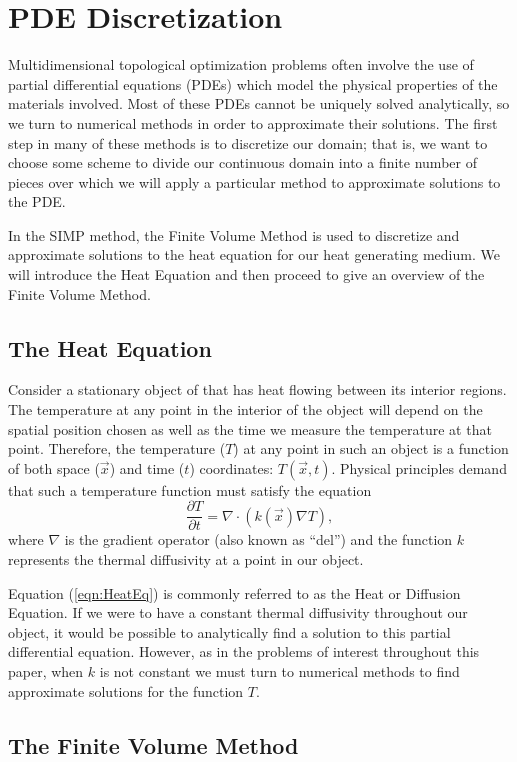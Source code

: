 \section{PDE Discretization}
Multidimensional topological optimization problems often involve the use of partial differential equations (PDEs) which model the physical properties of the materials involved. Most of these PDEs cannot be uniquely solved analytically, so we turn to numerical methods in order to approximate their solutions. The first step in many of these methods is to discretize our domain; that is, we want to choose some scheme to divide our continuous domain into a finite number of pieces over which we will apply a particular method to approximate solutions to the PDE.

In the SIMP method, the Finite Volume Method is used to discretize and approximate solutions to the heat equation for our heat generating medium. We will introduce the Heat Equation and then proceed to give an overview of the Finite Volume Method.
\subsection{The Heat Equation}
Consider a stationary object of that has heat flowing between its interior regions. The temperature at any point in the interior of the object will depend on the spatial position chosen as well as the time we measure the temperature at that point. Therefore, the temperature ($T$) at any point in such an object is a function of both space ($\vec{x}$) and time ($t$) coordinates: $T(\vec{x},t)$.
Physical principles demand that such a temperature function must satisfy the equation
\begin{equation}
	\frac{\partial T}{\partial t}=\nabla\cdot\left(k(\vec{x})\nabla T\right)\label{eqn:HeatEq},
\end{equation}
where $\nabla$ is the gradient operator (also known as ``del'') and the function $k$ represents the thermal diffusivity at a point in our object.

Equation (\ref{eqn:HeatEq}) is commonly referred to as the Heat or Diffusion Equation. If we were to have a constant thermal diffusivity throughout our object, it would be possible to analytically find a solution to this partial differential equation. However, as in the problems of interest throughout this paper, when $k$ is not constant we must turn to numerical methods to find approximate solutions for the function $T$.

\subsection{The Finite Volume Method}

